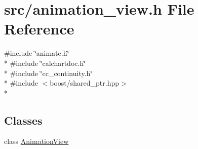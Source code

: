 \hypertarget{a00173}{\section{src/animation\-\_\-view.h File Reference}
\label{a00173}
}
{\ttfamily \#include \char`\"{}animate.\-h\char`\"{}}\\*
{\ttfamily \#include \char`\"{}calchartdoc.\-h\char`\"{}}\\*
{\ttfamily \#include \char`\"{}cc\-\_\-continuity.\-h\char`\"{}}\\*
{\ttfamily \#include $<$boost/shared\-\_\-ptr.\-hpp$>$}\\*
\subsection*{Classes}
\begin{DoxyCompactItemize}
\item 
class \hyperlink{a00015}{Animation\-View}
\end{DoxyCompactItemize}
